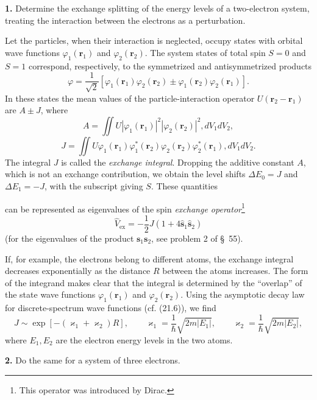 \ProblemHeading

\textbf{1.} Determine the exchange splitting of the energy levels of a two-electron system, treating the interaction between the electrons as a perturbation.

\SolutionHeading Let the particles, when their interaction is neglected, occupy states with orbital wave functions $\varphi_1(\mathbf r_1)$ and $\varphi_2(\mathbf r_2)$. The system states of total spin $S=0$ and $S=1$ correspond, respectively, to the symmetrized and antisymmetrized products
\[
 \varphi=\frac1{\sqrt2}[\varphi_1(\mathbf r_1)\varphi_2(\mathbf r_2)\pm\varphi_1(\mathbf r_2)\varphi_2(\mathbf r_1)].
\]
In these states the mean values of the particle-interaction operator $U(\mathbf r_2-\mathbf r_1)$ are $A\pm J$, where
\[
 A=\iint U|\varphi_1(\mathbf r_1)|^2|\varphi_2(\mathbf r_2)|^2,dV_1dV_2,
\]
\[
 J=\iint U\varphi_1(\mathbf r_1)\varphi_1^*(\mathbf r_2)\varphi_2(\mathbf r_2)\varphi_2^*(\mathbf r_1),dV_1dV_2.
\]
The integral $J$ is called the \emph{exchange integral}. Dropping the additive constant $A$, which is not an exchange contribution, we obtain the level shifts $\Delta E_0=J$ and $\Delta E_1=-J$, with the subscript giving $S$. These quantities

can be represented as eigenvalues of the spin \emph{exchange operator}\footnote{This operator was introduced by Dirac.}
\begin{equation}
 \widehat V_{\text{ex}}=-\frac12J(1+4\hat{\mathbf s}_1\hat{\mathbf s}_2)
 \tag{1}
\end{equation}
(for the eigenvalues of the product $\mathbf s_1\mathbf s_2$, see problem 2 of §~55).

If, for example, the electrons belong to different atoms, the exchange integral decreases exponentially as the distance $R$ between the atoms increases. The form of the integrand makes clear that the integral is determined by the ``overlap'' of the state wave functions $\varphi_1(\mathbf r_1)$ and $\varphi_2(\mathbf r_2)$. Using the asymptotic decay law for discrete-spectrum wave functions (cf. (21.6)), we find
\[
 J\sim\exp[-(\varkappa_1+\varkappa_2)R],\qquad
 \varkappa_1=\frac1\hbar\sqrt{2m|E_1|},\qquad
 \varkappa_2=\frac1\hbar\sqrt{2m|E_2|},
\]
where $E_1,E_2$ are the electron energy levels in the two atoms.

\textbf{2.} Do the same for a system of three electrons.

